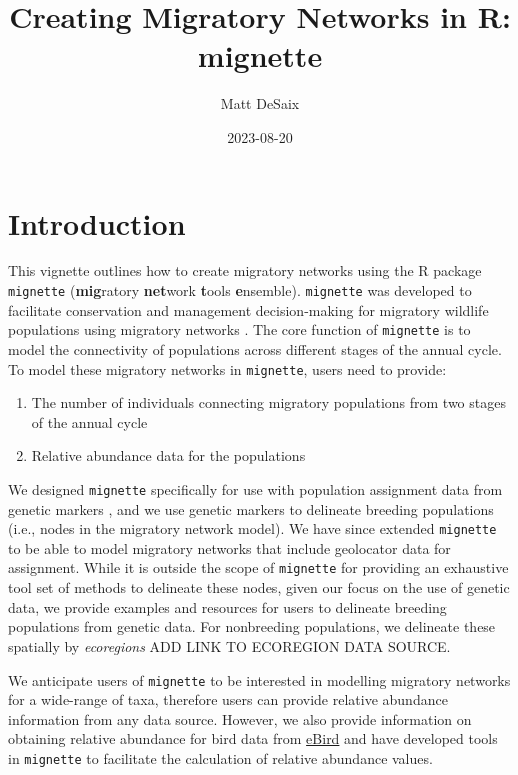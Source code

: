 \documentclass[
]{book}
\title{Creating Migratory Networks in R: mignette}
\author{Matt DeSaix}
\date{2023-08-20}
\providecommand{\tightlist}{%
  \setlength{\itemsep}{0pt}\setlength{\parskip}{0pt}}
\begin{document}
\maketitle

{
\setcounter{tocdepth}{1}
\tableofcontents
}
\hypertarget{introduction}{%
\chapter{Introduction}\label{introduction}}

This vignette outlines how to create migratory networks using the R package \texttt{mignette} (\textbf{mig}ratory \textbf{net}work \textbf{t}ools \textbf{e}nsemble). \texttt{mignette} was developed to facilitate conservation and management decision-making for migratory wildlife populations using migratory networks \citep{ruegg2020genoscape, taylor2010population}. The core function of \texttt{mignette} is to model the connectivity of populations across different stages of the annual cycle. To model these migratory networks in \texttt{mignette}, users need to provide:

\begin{enumerate}
\def\labelenumi{\arabic{enumi}.}
\tightlist
\item
  The number of individuals connecting migratory populations from two stages of the annual cycle
\item
  Relative abundance data for the populations
\end{enumerate}

We designed \texttt{mignette} specifically for use with population assignment data from genetic markers \citep{ruegg2014mapping, desaix2019population}, and we use genetic markers to delineate breeding populations (i.e., nodes in the migratory network model). We have since extended \texttt{mignette} to be able to model migratory networks that include geolocator data for assignment. While it is outside the scope of \texttt{mignette} for providing an exhaustive tool set of methods to delineate these nodes, given our focus on the use of genetic data, we provide examples and resources for users to delineate breeding populations from genetic data. For nonbreeding populations, we delineate these spatially by \emph{ecoregions} ADD LINK TO ECOREGION DATA SOURCE.

We anticipate users of \texttt{mignette} to be interested in modelling migratory networks for a wide-range of taxa, therefore users can provide relative abundance information from any data source. However, we also provide information on obtaining relative abundance for bird data from \href{https://ebird.org/science/status-and-trends}{eBird} and have developed tools in \texttt{mignette} to facilitate the calculation of relative abundance values.
\end{document}
